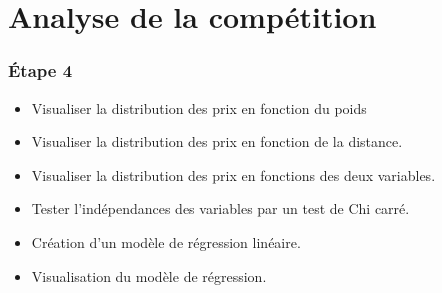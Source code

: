 \section{Analyse de la compétition}
 
\begin{frame}[fragile=singleslide]
  \frametitle{Étape 4}

\begin{itemize}
\item Visualiser la distribution des prix en fonction du poids
\item Visualiser la distribution des prix en fonction de la distance.
\item Visualiser la distribution des prix en fonctions des deux variables.
\item Tester l'indépendances des variables par un test de Chi carré.
\item Création d'un modèle de régression linéaire.
\item Visualisation du modèle de régression.
\end{itemize}
\end{frame}

